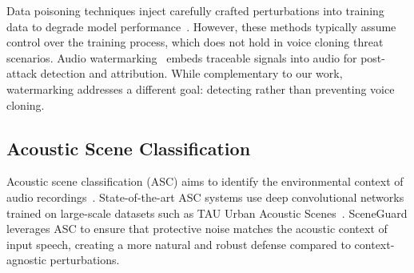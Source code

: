 Data poisoning techniques inject carefully crafted perturbations into training data to degrade model performance~\citep{poisoning}. However, these methods typically assume control over the training process, which does not hold in voice cloning threat scenarios. Audio watermarking~\citep{watermarking} embeds traceable signals into audio for post-attack detection and attribution. While complementary to our work, watermarking addresses a different goal: detecting rather than preventing voice cloning.

\subsection{Acoustic Scene Classification}

Acoustic scene classification (ASC) aims to identify the environmental context of audio recordings~\citep{tau_dataset}. State-of-the-art ASC systems use deep convolutional networks trained on large-scale datasets such as TAU Urban Acoustic Scenes~\citep{tau_dataset}. SceneGuard leverages ASC to ensure that protective noise matches the acoustic context of input speech, creating a more natural and robust defense compared to context-agnostic perturbations.

